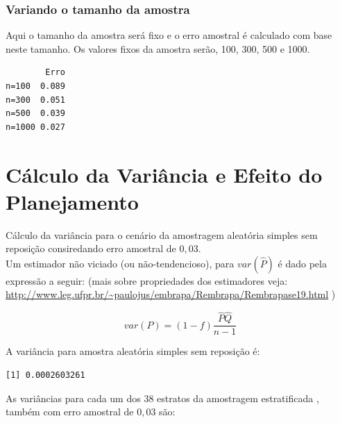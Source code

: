 \documentclass[12pt]{article}\usepackage[]{graphicx}\usepackage[]{color}
\makeatletter
\newenvironment{kframe}{%
 \def\at@end@of@kframe{}%
 \ifinner\ifhmode%
  \def\at@end@of@kframe{\end{minipage}}%
  \begin{minipage}{\columnwidth}%
 \fi\fi%
 \def\FrameCommand##1{\hskip\@totalleftmargin \hskip-\fboxsep
 \colorbox{shadecolor}{##1}\hskip-\fboxsep
     \hskip-\linewidth \hskip-\@totalleftmargin \hskip\columnwidth}%
 \MakeFramed {\advance\hsize-\width
   \@totalleftmargin\z@ \linewidth\hsize
   \@setminipage}}%
 {\par\unskip\endMakeFramed%
 \at@end@of@kframe}
\newenvironment{knitrout}{}{} %
\makeatother
\begin{document}
\subsubsection{Variando o tamanho da amostra}
\indent

Aqui o tamanho da amostra será fixo e o erro amostral
é calculado com base neste tamanho. Os valores fixos da amostra serão, 100, 300,
500 e 1000.\\

\begin{knitrout}\footnotesize
{}\color{fgcolor}\begin{kframe}
\begin{verbatim}
        Erro
n=100  0.089
n=300  0.051
n=500  0.039
n=1000 0.027
\end{verbatim}
\end{kframe}
\end{knitrout}


\section{Cálculo da Variância e Efeito do Planejamento}
\indent

Cálculo da variância para o cenário da amostragem aleatória simples sem
reposição consiredando erro amostral de $0,03$.\\
\indent
Um estimador não viciado (ou não-tendencioso), para $var(\hat{P})$ é dado
pela expressão a seguir: (mais sobre propriedades dos estimadores veja: \url{http://www.leg.ufpr.br/~paulojus/embrapa/Rembrapa/Rembrapase19.html} )


\begin{equation}
var(P) = (1-f)\frac{\hat{P} \hat{Q}}{n-1}
\end{equation}


A variância para amostra aleatória simples sem reposição é:\\
\indent
\begin{knitrout}\footnotesize
{}\color{fgcolor}\begin{kframe}
\begin{verbatim}
[1] 0.0002603261
\end{verbatim}
\end{kframe}
\end{knitrout}




As variâncias para cada um dos $38$ estratos da amostragem estratificada
, também com erro amostral de $0,03$ são:\\
\end{document}
